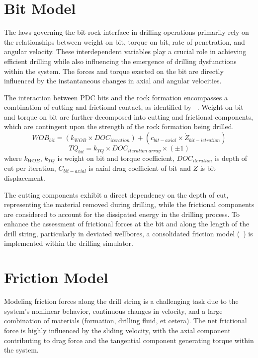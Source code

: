 \section{Bit Model}

The laws governing the bit-rock interface in drilling operations primarily rely on the relationships between weight on bit, torque on bit, rate of penetration, and angular velocity. These interdependent variables play a crucial role in achieving efficient drilling while also influencing the emergence of drilling dysfunctions within the system. The forces and torque exerted on the bit are directly influenced by the instantaneous changes in axial and angular velocities.

The interaction between PDC bits and the rock formation encompasses a combination of cutting and frictional contact, as identified by ~\cite{ref:detournay1992a}. Weight on bit and torque on bit are further decomposed into cutting and frictional components, which are contingent upon the strength of the rock formation being drilled.
\begin{equation}\label{WOB}
  WOB_{bit} = (k_{WOB}\times DOC_{iteration}) + (c_{bit-axial}\times \dot{Z}_{bit-ietration})
\end{equation}
\begin{equation}\label{Torque}
  TQ_{bit} = k_{TQ}\times DOC_{iteration\; array}\times (\pm1)
\end{equation}
where $k_{WOB}$, $k_{TQ}$ is weight on bit and torque coefficient, $DOC_{iteration}$ is depth of cut per iteration, $C_{bit-axial}$ is axial drag coefficient of bit and $Z$ is bit displacement.

The cutting components exhibit a direct dependency on the depth of cut, representing the material removed during drilling, while the frictional components are considered to account for the dissipated energy in the drilling process. To enhance the assessment of frictional forces at the bit and along the length of the drill string, particularly in deviated wellbores, a consolidated friction model (~\cite{ref:cayeux2020a}) is implemented within the drilling simulator.

\section{Friction Model}
Modeling friction forces along the drill string is a challenging task due to the system's nonlinear behavior, continuous changes in velocity, and a large combination of materials (formation, drilling fluid, et cetera). The net frictional force is highly influenced by the sliding velocity, with the axial component contributing to drag force and the tangential component generating torque within the system.
 
